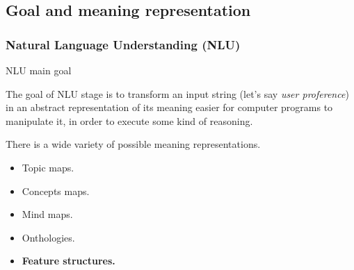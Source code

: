 \documentclass[11pt]{beamer}
\begin{document}
\subsection{Goal and meaning representation}

\begin{frame}
\frametitle{Natural Language Understanding (NLU)}
	\begin{block}{NLU main goal}
		\begin{center}
			\vspace{5pt}
			The goal of NLU stage is to transform an input string (let's say \textsl{user proference}) in an abstract representation of its meaning easier for computer programs to manipulate it, in order to execute some kind of reasoning.
			\vspace{5pt}
		\end{center}
	\end{block}
	\pause
	There is a wide variety of possible meaning representations.
	\begin{itemize}
		\item Topic maps.
		\item Concepts maps.
		\item Mind maps.
		\item Onthologies.
		\item \textbf{Feature structures.}
	\end{itemize}
\end{frame}
\end{document}
